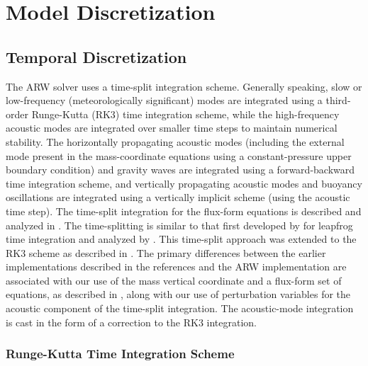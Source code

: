 \chapter{Model Discretization}
\label{discretization_chap}

\section{Temporal Discretization}

The ARW solver uses a time-split integration scheme.  Generally
speaking, slow or low-frequency (meteorologically significant) modes are
integrated using a third-order Runge-Kutta (RK3) time integration
scheme, while the high-frequency acoustic modes are integrated over
smaller time steps to maintain numerical stability.  The horizontally
propagating acoustic modes (including the external mode present in the
mass-coordinate equations using a constant-pressure upper boundary
condition) and gravity waves are integrated using a forward-backward
time integration scheme, and vertically propagating acoustic modes and
buoyancy oscillations are integrated using a vertically implicit scheme
(using the acoustic time step).  The time-split integration for the
flux-form equations is described and analyzed in
\citet{klemp_et_al_2007}.  The time-splitting is similar to that first
developed by \citet{klemp78} for leapfrog time integration and analyzed
by \citet{skamarock92}.  This time-split approach was extended to the
RK3 scheme as described in \citet{wicker02}.  The primary differences
between the earlier implementations described in the references and the
ARW implementation are associated with our use of the mass vertical
coordinate and a flux-form set of equations, as described in
\citet{klemp_et_al_2007}, along with our use of
perturbation variables for the acoustic component of the time-split
integration.  The acoustic-mode integration is cast in the form of a
correction to the RK3 integration.

\subsection{Runge-Kutta Time Integration Scheme}
\label{rk3_scheme}

